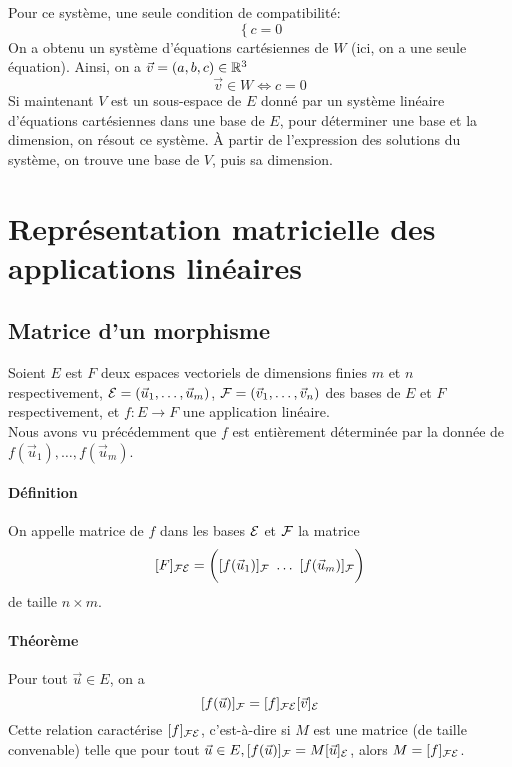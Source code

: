 Pour ce système, une seule condition de compatibilité:
$$\left\{ c = 0 \right.$$
On a obtenu un système d'équations cartésiennes de $W$ (ici, on a une seule équation). Ainsi, on a $\vec{v} = (a, b, c) \in \mathbb{R}^3$
$$\vec{v} \in W \Leftrightarrow c = 0$$
Si maintenant $V$ est un sous-espace de $E$ donné par un système linéaire d'équations cartésiennes dans une base de $E$, pour déterminer une base et la dimension, on résout ce système. À partir de l'expression des solutions du système, on trouve une base de $V$, puis sa dimension.

%
%
\section{Représentation matricielle des applications linéaires}
%
%

%
\subsection{Matrice d'un morphisme}
%
Soient $E$ est $F$ deux espaces vectoriels de dimensions finies $m$ et $n$ respectivement, $\mathcal{E} = (\vec{u}_1, \dots, \vec{u}_m)$, $\mathcal{F} = (\vec{v}_1, \ldots, \vec{v}_n)$ des bases de $E$ et $F$ respectivement, et $f: E \rightarrow F$ une application linéaire. \\
Nous avons vu précédemment que $f$ est entièrement déterminée par la donnée de $f(\vec{u}_1), \ldots, f(\vec{u}_m)$.

\paragraph{Définition} On appelle matrice de $f$ dans les bases $\mathcal{E}$ et $\mathcal{F}$ la  matrice
$$[F]_{\mathcal{F} \mathcal{E}} = \bigg(
  [f(\vec{u}_1)]_{\mathcal{F}} ~ \ldots ~ [f(\vec{u}_m)]_{\mathcal{F}}
\bigg)$$
de taille $n \times m$.

\paragraph{Théorème} Pour tout $\vec{u} \in E$, on a 
$$[f(\vec{u})]_{\mathcal{F}} = [f]_{\mathcal{F} \mathcal{E}} [\vec{v}]_{\mathcal{E}}$$
Cette relation caractérise $[f]_{\mathcal{F} \mathcal{E}}$, c'est-à-dire si $M$ est une matrice (de taille convenable) telle que pour tout $\vec{u} \in E, [f(\vec{u})]_{\mathcal{F}} = M [\vec{u}]_{\mathcal{E}}$, alors $M = [f]_{\mathcal{F} \mathcal{E}}$.

